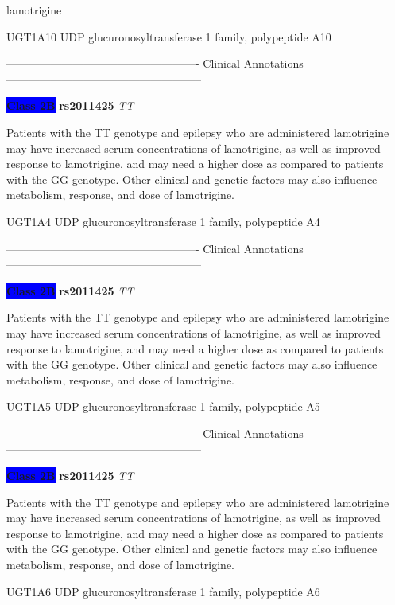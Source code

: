 \documentclass{resume} %
\begin{document}
\begin{rSection}{ lamotrigine }
\begin{rSubsection}{ UGT1A10 }{ UDP glucuronosyltransferase 1 family, polypeptide A10 }{}{}
\item[]

\item[] ---------------------------------------------------- Clinical Annotations -----------------------------------------------------\newline
\item \textbf{\colorbox{blue} {Class 2B}} \textbf{ rs2011425 } \textit{ TT }
\item[] Patients with the TT genotype and epilepsy who are administered lamotrigine may have increased serum concentrations of lamotrigine, as well as improved response to lamotrigine, and may need a higher dose as compared to patients with the GG genotype. Other clinical and genetic factors may also influence metabolism, response, and dose of lamotrigine.  
\end{rSubsection}\begin{rSubsection}{ UGT1A4 }{ UDP glucuronosyltransferase 1 family, polypeptide A4 }{}{}
\item[]

\item[] ---------------------------------------------------- Clinical Annotations -----------------------------------------------------\newline
\item \textbf{\colorbox{blue} {Class 2B}} \textbf{ rs2011425 } \textit{ TT }
\item[] Patients with the TT genotype and epilepsy who are administered lamotrigine may have increased serum concentrations of lamotrigine, as well as improved response to lamotrigine, and may need a higher dose as compared to patients with the GG genotype. Other clinical and genetic factors may also influence metabolism, response, and dose of lamotrigine.  
\end{rSubsection}\begin{rSubsection}{ UGT1A5 }{ UDP glucuronosyltransferase 1 family, polypeptide A5 }{}{}
\item[]

\item[] ---------------------------------------------------- Clinical Annotations -----------------------------------------------------\newline
\item \textbf{\colorbox{blue} {Class 2B}} \textbf{ rs2011425 } \textit{ TT }
\item[] Patients with the TT genotype and epilepsy who are administered lamotrigine may have increased serum concentrations of lamotrigine, as well as improved response to lamotrigine, and may need a higher dose as compared to patients with the GG genotype. Other clinical and genetic factors may also influence metabolism, response, and dose of lamotrigine.  
\end{rSubsection}\begin{rSubsection}{ UGT1A6 }{ UDP glucuronosyltransferase 1 family, polypeptide A6 }{}{}
\item[]


\end{rSubsection}
\end{rSection}
\end{document}

